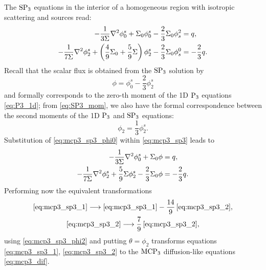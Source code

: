The $\SPN[3]$ equations in the interior of a homogeneous region with isotropic scattering and sources read:
\begin{equation}\label{eq:mcp3_sp3}
	\begin{aligned}
		-\frac{1}{3\Sigma}\lap\phi^s_0 + \Sigma_0\phi^s_0 - \frac{2}{3}\Sigma_0\phi_s^2 &= q,\\
		-\frac{1}{7\Sigma}\lap\phi^s_2 + \left(\frac{4}{9}\Sigma_0 + \frac{5}{9}\Sigma\right)\phi^s_2 -
		\frac{2}{3}\Sigma_0\phi_s^0 &= -\frac{2}{3}q.
	\end{aligned}
\end{equation}
Recall that the scalar flux is obtained from the $\SPN[3]$ solution by
\begin{equation}\label{eq:mcp3_sp3_phi0}
	\phi = \phi^s_0 - \frac{2}{3}\phi^s_2
\end{equation}
and formally corresponds to the zero-th moment of the 1D $\PN[3]$ equations \eqref{eq:P3_1d}; from \eqref{eq:SP3_mom},
we also have the formal correspondence between the second moments of the 1D $\PN[3]$ and $\SPN[3]$ equations: 
\begin{equation}\label{eq:mcp3_sp3_phi2}
	\phi_2 = \frac{1}{3}\phi^s_2.
\end{equation}
Substitution of \eqref{eq:mcp3_sp3_phi0} within \eqref{eq:mcp3_sp3} leads to
\begin{align}
\label{eq:mcp3_sp3_1}
	-\frac{1}{3\Sigma}\lap\phi^s_0 + \Sigma_0\phi &= q,\\
\label{eq:mcp3_sp3_2}
	-\frac{1}{7\Sigma}\lap\phi^s_2 + \frac{5}{9}\Sigma\phi^s_2 - \frac{2}{3}\Sigma_0\phi
	 &= -\frac{2}{3}q.
\end{align}
Performing now the equivalent transformations 
$$
\begin{gathered}
	\eqref{eq:mcp3_sp3_1} \longrightarrow \eqref{eq:mcp3_sp3_1} - \frac{14}{9}\,\eqref{eq:mcp3_sp3_2},\\
	\eqref{eq:mcp3_sp3_2} \longrightarrow \frac{7}{9}\,\eqref{eq:mcp3_sp3_2},
\end{gathered}
$$
using \eqref{eq:mcp3_sp3_phi2} and putting $\theta = \phi_2$ transforms equations \eqref{eq:mcp3_sp3_1},
\eqref{eq:mcp3_sp3_2} to the $\MCPN[3]$ diffusion-like equations \eqref{eq:mcp3_dif}.

